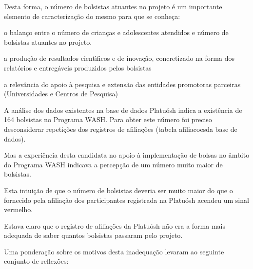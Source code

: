 \documentclass[
12pt,		%
openright,	%
twoside,  %
a4paper,			%
chapter=TITLE,		%
english,			%
french,				%
spanish,			%
brazil				%
]{USPSC-classe/USPSC}
\begin{document}
Desta forma, o n\'umero de bolsistas atuantes no projeto \'e um importante elemento de caracteriza\c{c}\~ao do mesmo para que se conhe\c{c}a:





\begin{alineas}
\item o balan\c{c}o entre o n\'umero de crian\c{c}as e adolescentes atendidos e n\'umero de  bolsistas atuantes no projeto.
\item a produ\c{c}\~ao de resultados cient\'{\i}ficos e de inova\c{c}\~ao, concretizado na forma dos relat\'orios  e entreg\'aveis produzidos pelos bolsistas
\item a relev\^ancia do apoio \`a pesquisa e extens\~ao das entidades promotoras parceiras (Universidades e Centros de Pesquisa)
\end{alineas}

A an\'alise dos dados existentes na base de dados Platu\'osh indica a exist\^encia de 164 bolsistas no Programa WASH. Para obter este n\'umero foi preciso desconsiderar repeti\c{c}\~oes dos registros de afilia\c{c}\~oes (tabela \textquotedbl afiliacoes\textquotedbl  da base de dados).




Mas a experi\^encia desta candidata no apoio \`a implementa\c{c}\~ao de bolsas no \^ambito do Programa WASH indicava a percep\c{c}\~ao de um n\'umero muito maior de bolsistas.




Esta intui\c{c}\~ao de que o n\'umero de bolsistas deveria ser muito maior do que o fornecido pela afilia\c{c}\~ao dos participantes registrada na Platu\'osh acendeu um sinal vermelho.




Estava claro que o registro de afilia\c{c}\~oes da Platu\'osh n\~ao era a forma mais adequada de saber quantos bolsistas passaram pelo projeto.









Uma pondera\c{c}\~ao sobre os motivos desta inadequa\c{c}\~ao levaram ao seguinte conjunto de reflex\~oes:
\end{document}

